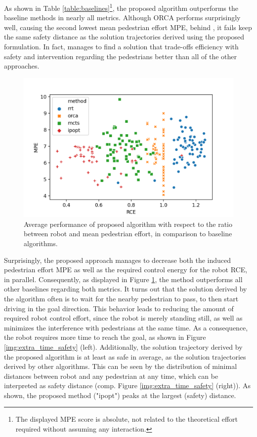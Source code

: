As shown in Table \ref{table:baselines}\footnote{The displayed MPE score is absolute, not related to the theoretical effort required without assuming any interaction.}, the proposed algorithm outperforms the baseline methods in nearly all metrics. Although \ac{ORCA} performs surprisingly well, causing the second lowest mean pedestrian effort \ac{MPE}, behind \project, it fails keep the same safety distance as the solution trajectories derived using the proposed formulation. In fact, \project manages to find a solution that trade-offs efficiency with safety and intervention regarding the pedestrians better than all of the other approaches.  

\begin{figure}[!ht]
\begin{center}
\includegraphics[width=\imgwidth]{images/ego_ado_effort.png}
\end{center}
\caption{Average performance of proposed algorithm with respect to the ratio between robot and mean pedestrian effort, in comparison to baseline algorithms.}
\label{img:ego_ado_effort}
\end{figure}

Surprisingly, the proposed approach manages to decrease both the induced pedestrian effort \ac{MPE} as well as the required control energy for the robot \ac{RCE}, in parallel. Consequently, as displayed in Figure \ref{img:ego_ado_effort}, the method outperforms all other baselines regarding both metrics. It turns out that the solution derived by the algorithm often is to wait for the nearby pedestrian to pass, to then start driving in the goal direction. This behavior leads to reducing the amount of required robot control effort, since the robot is merely standing still, as well as minimizes the interference with pedestrians at the same time. As a consequence, the robot requires more time to reach the goal, as shown in Figure \ref{img:extra_time_safety} (left). Additionally, the solution trajectory derived by the proposed algorithm is at least as safe in average, as the solution trajectories derived by other algorithms. This can be seen by the distribution of minimal distances between robot and any pedestrian at any time, which can be interpreted as safety distance (comp. Figure \ref{img:extra_time_safety} (right)). As shown, the proposed method ("ipopt") peaks at the largest (safety) distance.

